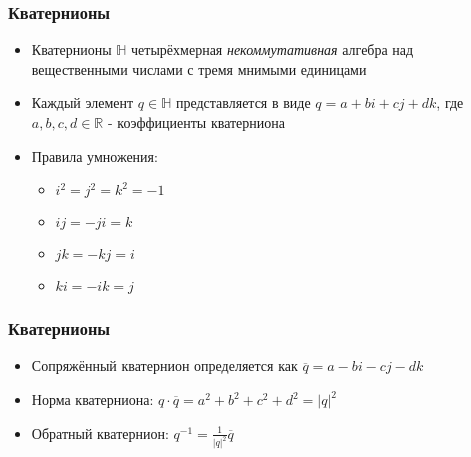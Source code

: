 \documentclass{beamer}
\begin{document}
\begin{frame}[fragile]
\frametitle{Кватернионы}
\begin{itemize}
\item Кватернионы \begin{math}\mathbb H\end{math} \textendash{} четырёхмерная \textit{некоммутативная} алгебра над вещественными числами с тремя мнимыми единицами
\item Каждый элемент \begin{math}q\in \mathbb H\end{math} представляется в виде \begin{math}q = a + bi + cj + dk\end{math}, где \begin{math}a, b, c, d \in \mathbb R\end{math} - коэффициенты кватерниона
\pause
\item Правила умножения:
\begin{itemize}
\item \begin{math}i^2=j^2=k^2=-1\end{math}
\item \begin{math}ij=-ji=k\end{math}
\item \begin{math}jk=-kj=i\end{math}
\item \begin{math}ki=-ik=j\end{math}
\end{itemize}
\end{itemize}
\end{frame}

\begin{frame}[fragile]
\frametitle{Кватернионы}
\begin{itemize}
\item Сопряжённый кватернион определяется как \begin{math}\overline q = a - bi - cj - dk\end{math}
\item Норма кватерниона: \begin{math}q \cdot \overline q = a^2 + b^2 + c^2 + d^2 = |q|^2\end{math}
\item Обратный кватернион: \begin{math}q^{-1} = \frac{1}{|q|^2} \overline q\end{math}
\end{itemize}
\end{frame}
\end{document}
